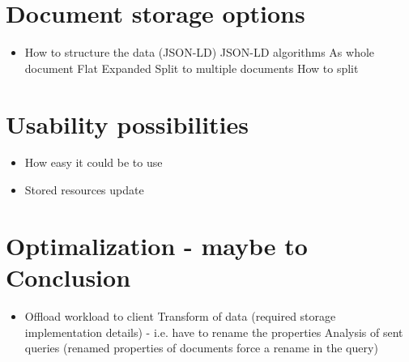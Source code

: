 \section{Document storage options}
\begin{itemize}
	\item How to structure the data (JSON-LD)
		\subitem JSON-LD algorithms
		\subitem As whole document
			\subsubitem Flat
			\subsubitem Expanded
		\subitem Split to multiple documents
			\subsubitem How to split
\end{itemize}

\section{Usability possibilities}
\begin{itemize}
	\item How easy it could be to use
	\item Stored resources update
\end{itemize}

\section{Optimalization - maybe to Conclusion}
\begin{itemize}
	\item Offload workload to client
		\subitem Transform of data (required storage implementation details) - i.e. have to rename the properties
		\subitem Analysis of sent queries (renamed properties of documents force a rename in the query)
\end{itemize}





